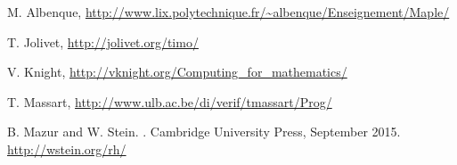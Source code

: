 \begin{thebibliography}{20}

M. Albenque,
\newblock \url{http://www.lix.polytechnique.fr/~albenque/Enseignement/Maple/}

T. Jolivet,
\newblock \url{http://jolivet.org/timo/}

V. Knight,
\newblock \url{http://vknight.org/Computing_for_mathematics/}

T. Massart,
\newblock \url{http://www.ulb.ac.be/di/verif/tmassart/Prog/}

B. Mazur and W. Stein.
.
\newblock Cambridge University Press, September 2015.
\newblock \url{http://wstein.org/rh/}

\end{thebibliography}


